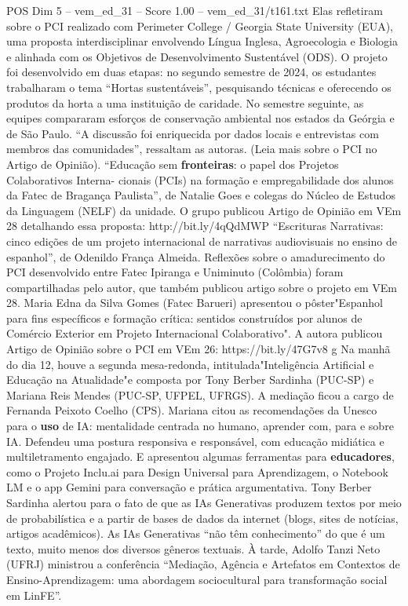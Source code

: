 \begin{textsample}{POS Dim 5 – vem\_ed\_31 – Score 1.00 – vem\_ed\_31/t161.txt}
Elas refletiram sobre o PCI realizado com Perimeter College / Georgia State University (EUA), uma proposta interdisciplinar envolvendo Língua Inglesa, Agroecologia e Biologia e alinhada com os Objetivos de Desenvolvimento Sustentável (ODS).
O projeto foi desenvolvido em duas etapas: no segundo semestre de 2024, os estudantes trabalharam o tema “Hortas sustentáveis”, pesquisando técnicas e oferecendo os produtos da horta a uma instituição de caridade.
No semestre seguinte, as equipes compararam esforços de conservação ambiental nos estados da Geórgia e de São Paulo. “A discussão foi enriquecida por dados locais e entrevistas com membros das comunidades”, ressaltam as autoras. (Leia mais sobre o PCI no Artigo de Opinião). “Educação sem \textbf{fronteiras}: o papel dos Projetos Colaborativos Interna- cionais (PCIs) na formação e empregabilidade dos alunos da Fatec de Bragança Paulista”, de Natalie Goes e colegas do Núcleo de Estudos da Linguagem (NELF) da unidade.
O grupo publicou Artigo de Opinião em VEm 28 detalhando essa proposta: http://bit.ly/4qQdMWP “Escrituras Narrativas: cinco edições de um projeto internacional de narrativas audiovisuais no ensino de espanhol”, de Odenildo França Almeida.
Reflexões sobre o amadurecimento do PCI desenvolvido entre Fatec Ipiranga e Uniminuto (Colômbia) foram compartilhadas pelo autor, que também publicou artigo sobre o projeto em VEm 28.
Maria Edna da Silva Gomes (Fatec Barueri) apresentou o pôster"Espanhol para fins específicos e formação crítica: sentidos construídos por alunos de Comércio Exterior em Projeto Internacional Colaborativo".
A autora publicou Artigo de Opinião sobre o PCI em VEm 26: https://bit.ly/47G7v8 g Na manhã do dia 12, houve a segunda mesa-redonda, intitulada"Inteligência Artificial e Educação na Atualidade"e composta por Tony Berber Sardinha (PUC-SP) e Mariana Reis Mendes (PUC-SP, UFPEL, UFRGS).
A mediação ficou a cargo de Fernanda Peixoto Coelho (CPS).
Mariana citou as recomendações da Unesco para o \textbf{uso} de IA: mentalidade centrada no humano, aprender com, para e sobre IA.
Defendeu uma postura responsiva e responsável, com educação midiática e multiletramento engajado.
E apresentou algumas ferramentas para \textbf{educadores}, como o Projeto Inclu.ai para Design Universal para Aprendizagem, o Notebook LM e o app Gemini para conversação e prática argumentativa.
Tony Berber Sardinha alertou para o fato de que as IAs Generativas produzem textos por meio de probabilística e a partir de bases de dados da internet (blogs, sites de notícias, artigos acadêmicos).
As IAs Generativas “não têm conhecimento” do que é um texto, muito menos dos diversos gêneros textuais. À tarde, Adolfo Tanzi Neto (UFRJ) ministrou a conferência “Mediação, Agência e Artefatos em Contextos de Ensino-Aprendizagem: uma abordagem sociocultural para transformação social em LinFE”.

\end{textsample}
